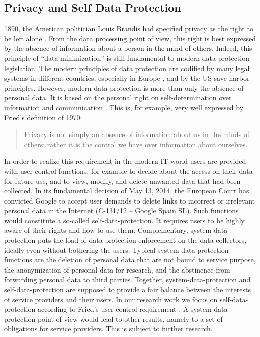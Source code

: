 \documentclass[runningheads,a4paper]{llncs}
\begin{document}
\subsection{Privacy and Self Data Protection}
1890, the American politician Louis Brandis had specified privacy as the right to be left alone \cite{WarrenBrandeis:RightToPrivacy}. From the data processing point of view, this right is best expressed by the absence of information about a person in the mind of others. Indeed, this principle of “data minimization” is still fundamental to modern data protection legislation. The modern principles of data protection are codified by many legal systems in different countries, especially in Europe \cite{EU-directive2}, and by the US save harbor principles. However, modern data protection is more than only the absence of personal data. It is based on the personal right on self-determination over information and communication \cite{BVerfG:census}. This is, for example, very well expressed by Fried’s definition of 1970:
\begin{quote}
	Privacy is not simply an absence of information about us in the minds of others; rather it is the control we have over information about ourselves. \cite{CFried:Privacy}
\end{quote}
In order to realize this requirement in the modern IT world users are provided with user control functions, for example to decide about the access on their data for future use, and to view, modify, and delete unwanted data that had been collected. In its fundamental decision of May 13, 2014, the European Court has convicted Google to accept user demands to delete links to incorrect or irrelevant personal data in the Internet (C-131/12 – Google Spain SL). Such functions would constitute a so-called self-data-protection. It requires users to be highly aware of their rights and how to use them. Complementary, system-data-protection puts the load of data protection enforcement on the data collectors, ideally even without bothering the users. Typical system data protection functions are the deletion of personal data that are not bound to service purpose, the anonymization of personal data for research, and the abstinence from forwarding personal data to third parties. Together, system-data-protection and self-data-protection are supposed to provide a fair balance between the interests of service providers and their users.
In our research work we focus on self-data-protection according to Fried’s user control requirement \cite{CFried:Privacy}. A system data protection point of view would lead to other results, namely to a set of obligations for service providers. This is subject to further research.
\end{document}
